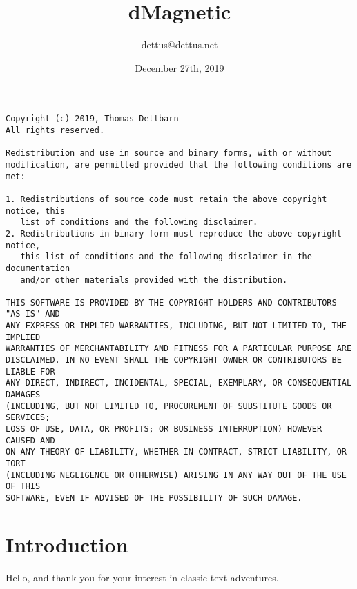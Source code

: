 \documentclass[11pt,twoside,openright]{report}
\begin{document}
\title{dMagnetic}
\author{dettus@dettus.net}
\date{December 27th, 2019}
\maketitle
{\tiny
\begin{verbatim}
Copyright (c) 2019, Thomas Dettbarn
All rights reserved.

Redistribution and use in source and binary forms, with or without
modification, are permitted provided that the following conditions are met:

1. Redistributions of source code must retain the above copyright notice, this
   list of conditions and the following disclaimer.
2. Redistributions in binary form must reproduce the above copyright notice,
   this list of conditions and the following disclaimer in the documentation
   and/or other materials provided with the distribution.

THIS SOFTWARE IS PROVIDED BY THE COPYRIGHT HOLDERS AND CONTRIBUTORS "AS IS" AND
ANY EXPRESS OR IMPLIED WARRANTIES, INCLUDING, BUT NOT LIMITED TO, THE IMPLIED
WARRANTIES OF MERCHANTABILITY AND FITNESS FOR A PARTICULAR PURPOSE ARE
DISCLAIMED. IN NO EVENT SHALL THE COPYRIGHT OWNER OR CONTRIBUTORS BE LIABLE FOR
ANY DIRECT, INDIRECT, INCIDENTAL, SPECIAL, EXEMPLARY, OR CONSEQUENTIAL DAMAGES
(INCLUDING, BUT NOT LIMITED TO, PROCUREMENT OF SUBSTITUTE GOODS OR SERVICES;
LOSS OF USE, DATA, OR PROFITS; OR BUSINESS INTERRUPTION) HOWEVER CAUSED AND
ON ANY THEORY OF LIABILITY, WHETHER IN CONTRACT, STRICT LIABILITY, OR TORT
(INCLUDING NEGLIGENCE OR OTHERWISE) ARISING IN ANY WAY OUT OF THE USE OF THIS
SOFTWARE, EVEN IF ADVISED OF THE POSSIBILITY OF SUCH DAMAGE.
\end{verbatim}
}
\tableofcontents
\newpage
\chapter{Introduction}
Hello, and thank you for your interest in classic text adventures. 
\end{document}
